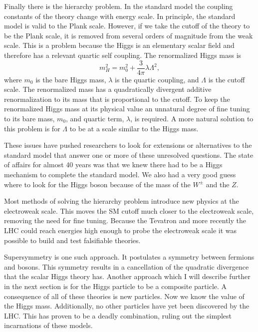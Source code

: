 Finally there is the hierarchy problem.
In the standard model the coupling constants of the theory change with energy scale.
In principle, the standard model is valid to the Plank scale.
However, if we take the cutoff of the theory to be the Plank scale, it is removed from several orders of magnitude from the weak scale.
This is a problem because the Higgs is an elementary scalar field and therefore has a relevant quartic self coupling.
The renormalized Higgs mass is
\begin{equation}
  m^2_H=m_0^2+\frac{3}{4\pi}\lambda\Lambda^2,
\end{equation}
where $m_0$ is the bare Higgs mass, $\lambda$ is the quartic coupling, and $\Lambda$ is the cutoff scale.
The renormalized mass has a quadratically divergent additive renormalization to its mass that is proportional to the cutoff.
To keep the renormalized Higgs mass at its physical value an unnatural degree of fine tuning to its bare mass, $m_0$, and quartic term, $\lambda$, is required.
A more natural solution to this problem is for $\Lambda$ to be at a scale similar to the Higgs mass.

These issues have pushed researchers to look for extensions or alternatives to the standard model that answer one or more of these unresolved questions.
The state of affairs for almost 40 years was that we knew there had to be a Higgs mechanism to complete the standard model.
We also had a very good guess where to look for the Higgs boson because of the mass of the $W^{\pm}$ and the $Z$.

Most methods of solving the hierarchy problem introduce new physics at the electroweak scale.
This moves the SM cutoff much closer to the electroweak scale, removing the need for fine tuning.
Because the Tevatron and more recently the LHC could reach energies high enough to probe the electroweak scale it was possible to build and test falsifiable theories.

Supersymmetry is one such approach.
It postulates a symmetry between fermions and bosons.
This symmetry results in a cancellation of the quadratic divergence that the scalar Higgs theory has.
Another approach which I will describe further in the next section is for the Higgs particle to be a composite particle.
A consequence of all of these theories is new particles.
Now we know the value of the Higgs mass.
Additionally, no other particles have yet been discovered by the LHC. 
This has proven to be a deadly combination, ruling out the simplest incarnations of these models.
